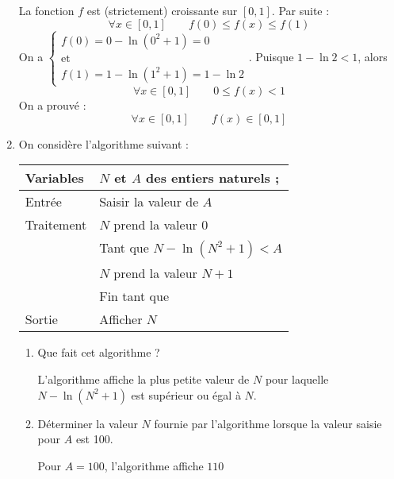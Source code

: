 \documentclass[12pt]{cornouaille}
\newcommand{\syst}[2]{\left\{\begin{array}{#1}#2\end{array}\right.}
\begin{document}
\begin{exercice}
\begin{enumerate}
\begin{solution}
La  fonction $f$ est (strictement) croissante sur $[0,1]$. Par suite :
\[\forall x\in [0,1]\qquad f(0)\leqslant f(x)\leqslant f(1)\]
On a $\syst{l}{f(0)=0-\ln(0^2+1)=0\\ \text{et}\\ f(1)=1-\ln(1^2+1)=1-\ln 2}$. Puisque $1-\ln 2<1$, alors 
%
\[\forall x\in [0,1]\qquad 0\leqslant f(x)<1\]
On a prouvé :
\[ \forall x\in[0,1]\qquad f(x)\in[0,1]\]
\end{solution}
\item  On considère l'algorithme suivant :
\begin{center}
\begin{tabularx}{0.7\linewidth}{|l|X|}\hline
Variables 	&$N$ et $A$ des entiers naturels ;\\ \hline
Entrée 		&Saisir la valeur de $A$\\ \hline
Traitement 	&$N$ prend la valeur $0$\\
			&Tant que $N - \ln\left(N^2 + 1\right) < A$\\
			&\hspace{0,6cm}$N$ prend la valeur $N + 1$\\ 
			&Fin tant que\\ \hline
Sortie &Afficher $N$\\ \hline
\end{tabularx}
\end{center}
	\begin{enumerate}
		\item Que fait cet algorithme ?

\begin{solution}
L'algorithme affiche la plus petite valeur de $N$ pour laquelle $N-\ln(N^2+1)$ est supérieur ou égal à $N$.
\end{solution}
		\item Déterminer la valeur $N$ fournie par l'algorithme lorsque la valeur saisie pour $A$ est 100.

\begin{solution}
Pour $A=100$, l'algorithme affiche $110$
\end{solution}
 	\end{enumerate}
 \end{enumerate}
 
\bigskip


\end{exercice}
\end{document}
